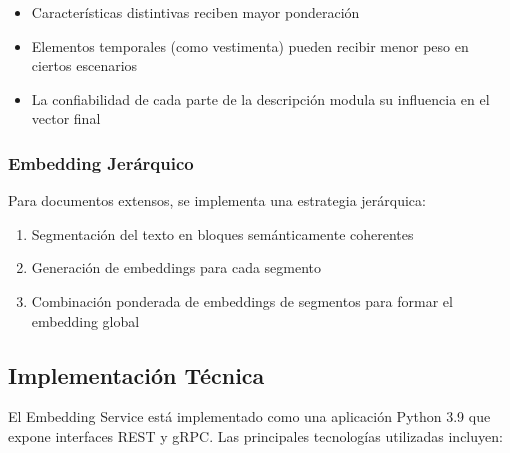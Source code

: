 \documentclass[12pt,a4paper]{article}
\begin{document}
\begin{itemize}
    \item Características distintivas reciben mayor ponderación
    \item Elementos temporales (como vestimenta) pueden recibir menor peso en ciertos escenarios
    \item La confiabilidad de cada parte de la descripción modula su influencia en el vector final
\end{itemize}

\subsubsection{Embedding Jerárquico}
Para documentos extensos, se implementa una estrategia jerárquica:

\begin{enumerate}
    \item Segmentación del texto en bloques semánticamente coherentes
    \item Generación de embeddings para cada segmento
    \item Combinación ponderada de embeddings de segmentos para formar el embedding global
\end{enumerate}

\subsection{Implementación Técnica}
\label{subsec:es-implementacion}

El Embedding Service está implementado como una aplicación Python 3.9 que expone interfaces REST y gRPC. Las principales tecnologías utilizadas incluyen:
\end{document}
